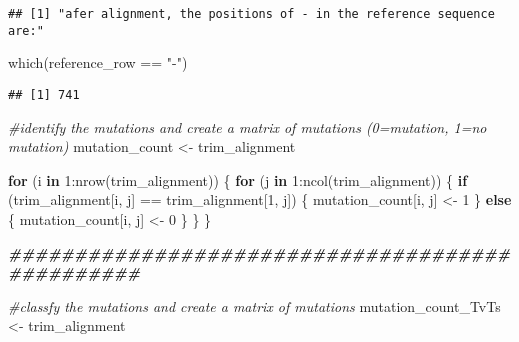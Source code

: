 \documentclass[
]{article}
\newenvironment{Shaded}{\begin{snugshade}}{\end{snugshade}}
\newcommand{\CommentTok}[1]{\textcolor[rgb]{0.56,0.35,0.01}{\textit{#1}}}
\newcommand{\ControlFlowTok}[1]{\textcolor[rgb]{0.13,0.29,0.53}{\textbf{#1}}}
\newcommand{\DecValTok}[1]{\textcolor[rgb]{0.00,0.00,0.81}{#1}}
\newcommand{\DocumentationTok}[1]{\textcolor[rgb]{0.56,0.35,0.01}{\textbf{\textit{#1}}}}
\newcommand{\FunctionTok}[1]{\textcolor[rgb]{0.00,0.00,0.00}{#1}}
\newcommand{\NormalTok}[1]{#1}
\newcommand{\OtherTok}[1]{\textcolor[rgb]{0.56,0.35,0.01}{#1}}
\newcommand{\SpecialCharTok}[1]{\textcolor[rgb]{0.00,0.00,0.00}{#1}}
\newcommand{\StringTok}[1]{\textcolor[rgb]{0.31,0.60,0.02}{#1}}
\begin{document}
\begin{verbatim}
## [1] "afer alignment, the positions of - in the reference sequence are:"
\end{verbatim}

\begin{Shaded}
\begin{Highlighting}[]
\FunctionTok{which}\NormalTok{(reference\_row }\SpecialCharTok{==} \StringTok{"{-}"}\NormalTok{)}
\end{Highlighting}
\end{Shaded}

\begin{verbatim}
## [1] 741
\end{verbatim}

\begin{Shaded}
\begin{Highlighting}[]
\CommentTok{\#identify the mutations and create a matrix of mutations (0=mutation, 1=no mutation)}
\NormalTok{mutation\_count }\OtherTok{\textless{}{-}}\NormalTok{ trim\_alignment}

\ControlFlowTok{for}\NormalTok{ (i }\ControlFlowTok{in} \DecValTok{1}\SpecialCharTok{:}\FunctionTok{nrow}\NormalTok{(trim\_alignment)) }
\NormalTok{\{}
  \ControlFlowTok{for}\NormalTok{ (j }\ControlFlowTok{in} \DecValTok{1}\SpecialCharTok{:}\FunctionTok{ncol}\NormalTok{(trim\_alignment)) }
\NormalTok{  \{}
    \ControlFlowTok{if}\NormalTok{ (trim\_alignment[i, j] }\SpecialCharTok{==}\NormalTok{ trim\_alignment[}\DecValTok{1}\NormalTok{, j]) }
\NormalTok{    \{}
\NormalTok{      mutation\_count[i, j] }\OtherTok{\textless{}{-}} \DecValTok{1}
\NormalTok{    \} }
    \ControlFlowTok{else} 
\NormalTok{    \{}
\NormalTok{      mutation\_count[i, j] }\OtherTok{\textless{}{-}} \DecValTok{0}
\NormalTok{    \}}
\NormalTok{  \}}
\NormalTok{\}}

\DocumentationTok{\#\#\#\#\#\#\#\#\#\#\#\#\#\#\#\#\#\#\#\#\#\#\#\#\#\#\#\#\#\#\#\#\#\#\#\#\#\#\#\#\#\#\#\#\#\#\#\#}

\CommentTok{\#classfy the mutations and create a matrix of mutations}
\NormalTok{mutation\_count\_TvTs }\OtherTok{\textless{}{-}}\NormalTok{ trim\_alignment}


\end{Highlighting}
\end{Shaded}
\end{document}
